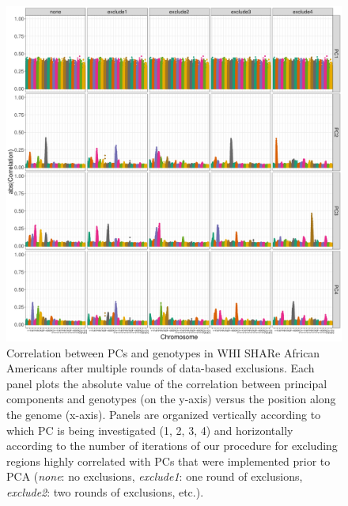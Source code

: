 \documentclass[12pt]{article}
\begin{document}
\begin{figure}[h]
\center
\includegraphics[width=\textwidth]{figs/pc_geno_corr/pc_geno_corr_compare_exclude}
\caption{Correlation between PCs and genotypes in WHI SHARe African Americans after multiple rounds of data-based exclusions. Each panel plots the absolute value of the correlation between principal components and genotypes (on the y-axis) versus the position along the genome (x-axis).  Panels are organized vertically according to which PC is being investigated (1, 2, 3, 4) and horizontally according to the number of iterations of our procedure for excluding regions highly correlated with PCs that were implemented prior to PCA (\textit{none}: no exclusions, \textit{exclude1}: one round of exclusions, \textit{exclude2}: two rounds of exclusions, etc.).}
\label{fig:corr-compare-exclude}
\end{figure}
\end{document}
